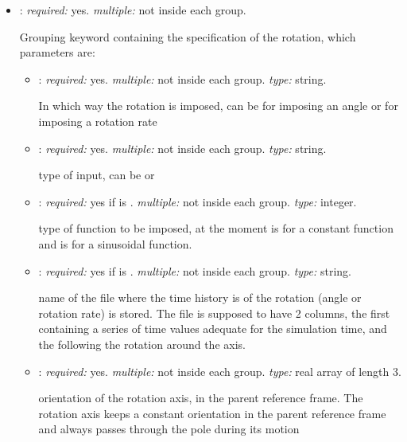 \begin{itemize}
\item {}: \textit{required:} yes. \textit{multiple:} not inside each 
 group.

Grouping keyword containing the specification of the rotation, which parameters are:

    \begin{itemize}
    \item {}: \textit{required:} yes. \textit{multiple:} not inside each 
     group. \textit{type:} string.
    
    In which way the rotation is imposed, can be  for imposing an angle  
    or  for imposing a rotation rate
    
    \item {}: \textit{required:} yes. \textit{multiple:} not inside 
    each  group. \textit{type:} string.
    
    type of input, can be  or 
    
    \item {}: \textit{required:} yes if  is 
    . \textit{multiple:} not inside each  group. 
    \textit{type:} integer.
    
    type of function to be imposed, at the moment  is for a constant function 
    and  is for a sinusoidal function.
    
        \item {}: \textit{required:} yes if  is 
        . \textit{multiple:} not inside each  group. 
        \textit{type:} string.
        
        name of the file where the time history is of the rotation 
        (angle or rotation rate) is stored. The file is supposed to have 2 columns, 
        the first containing a series of time values adequate for the simulation time, 
        and the following the rotation around the axis. 
        
    \item {}: \textit{required:} yes. \textit{multiple:} not inside each 
     group. \textit{type:} real array of length 3.
    
    orientation of the rotation axis, in the parent reference frame. The rotation 
    axis keeps a constant orientation in the parent reference frame and always passes 
    through the pole during its motion
    

\end{itemize}
\end{itemize}
